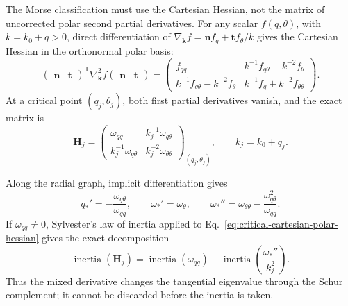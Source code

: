 The Morse classification must use the Cartesian Hessian, not the matrix of
uncorrected polar second partial derivatives.  For any scalar
\(f(q,\theta)\), with \(k=k_0+q>0\), direct differentiation of
\(
  \nabla_{\mathbf k}f
  =\mathbf n f_q+\mathbf t f_\theta/k
\)
gives the Cartesian Hessian in the orthonormal polar basis:
\begin{equation}
  \begin{pmatrix}\mathbf n&\mathbf t\end{pmatrix}^{\mathsf T}
  \nabla_{\mathbf k}^2f
  \begin{pmatrix}\mathbf n&\mathbf t\end{pmatrix}
  =
  \begin{pmatrix}
    f_{qq}
      &k^{-1}f_{q\theta}-k^{-2}f_\theta\\[2pt]
    k^{-1}f_{q\theta}-k^{-2}f_\theta
      &k^{-1}f_q+k^{-2}f_{\theta\theta}
  \end{pmatrix}.
  \label{eq:general-cartesian-polar-hessian}
\end{equation}
At a critical point \((q_j,\theta_j)\), both first partial derivatives
vanish, and the exact matrix is
\begin{equation}
  \mathbf H_j
  =
  \begin{pmatrix}
    \omega_{qq}
      &k_j^{-1}\omega_{q\theta}\\[2pt]
    k_j^{-1}\omega_{q\theta}
      &k_j^{-2}\omega_{\theta\theta}
  \end{pmatrix}_{(q_j,\theta_j)},
  \qquad k_j=k_0+q_j.
  \label{eq:critical-cartesian-polar-hessian}
\end{equation}

Along the radial graph, implicit differentiation gives
\begin{equation}
  q_*'=-\frac{\omega_{q\theta}}{\omega_{qq}},
  \qquad
  \omega_*'=\omega_\theta,
  \qquad
  \omega_*''
  =\omega_{\theta\theta}
   -\frac{\omega_{q\theta}^2}{\omega_{qq}}.
  \label{eq:reduced-angular-schur-derivative}
\end{equation}
If \(\omega_{qq}\ne0\), Sylvester's law of inertia applied to
Eq.~\eqref{eq:critical-cartesian-polar-hessian} gives the exact decomposition
\begin{equation}
  \operatorname{inertia}(\mathbf H_j)
  =\operatorname{inertia}(\omega_{qq})
   +\operatorname{inertia}\left(
      \frac{\omega_*''}{k_j^2}
    \right).
  \label{eq:hessian-schur-inertia}
\end{equation}
Thus the mixed derivative changes the tangential eigenvalue through the
Schur complement; it cannot be discarded before the inertia is taken.

